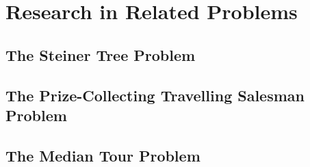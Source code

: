 \chapter{Research in Related Problems}
\label{chap:related}
\section{The Steiner Tree Problem}

\section{The Prize-Collecting Travelling Salesman Problem}

\section{The Median Tour Problem}


